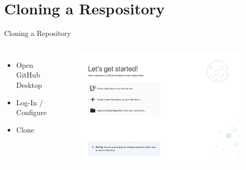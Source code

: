 \documentclass{beamer}
\begin{document}
    \section{Cloning a Respository}\label{sec:cloning-a-respository}
    \begin{frame}{Cloning a Repository}
        \begin{columns}
            \begin{itemize}
                \item Open GitHub Desktop
                \item Log-In / Configure
                \item Clone
            \end{itemize}

            \begin{figure}
                \centering
                \includegraphics[width=\textwidth]{figures/clone_1.png}
            \end{figure}
        \end{columns}
    \end{frame}
\end{document}
